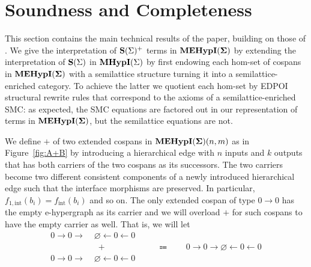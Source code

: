 \section{Soundness and Completeness}\label{sec:soundness-and-completeness}

This section contains the main technical results of the paper,  building on those of \cite{bonchi_string_2022-2}.
We give the interpretation of $\mathbf{S}(\Sigma)^{+}$ terms in ${\mathbf{MEHypI(\Sigma)}}$ by extending the interpretation of $\mathbf{S}(\Sigma)$ in $\textbf{MHypI}(\Sigma)$ by first endowing each hom-set of cospans in ${\mathbf{MEHypI(\Sigma)}}$ with a semilattice structure turning it into a semilattice-enriched category.
To achieve the latter we quotient each hom-set by EDPOI structural rewrite rules that correspond to the axioms of a semilattice-enriched SMC:
as expected,  the SMC equations are factored out in our representation of terms in ${\mathbf{MEHypI(\Sigma)}}$,  but the semilattice equations are not.  


\begin{definition}
We define $+$ of two extended cospans in ${\mathbf{MEHypI(\Sigma)}}(n,m)$ as in Figure~\ref{fig:A+B}
by introducing a hierarchical edge with $n$ inputs and $k$ outputs that has both carriers of the two cospans as its successors.
The two carriers become two different consistent components of a newly introduced hierarchical edge such that the interface morphisms are preserved.
In particular, $f_{1,\text{int}}(b_i) = f_{\text{int}}(b_i)$ and so on.
The only extended cospan of type $0 \to 0$ has the empty e-hypergraph as its carrier and we will overload $+$ for such cospans to have the empty carrier as well.
That is, we will let 
\begin{align*}
	0 \to 0 \to \;&\varnothing \xleftarrow{} 0 \xleftarrow{} 0\\
	&\;+ \hspace{6em} \Coloneqq \hspace{2em} 0 \to 0 \to \varnothing \xleftarrow{} 0 \xleftarrow{} 0\\
	0 \to 0 \to \;&\varnothing \xleftarrow{} 0 \xleftarrow{} 0
\end{align*}
\end{definition}

